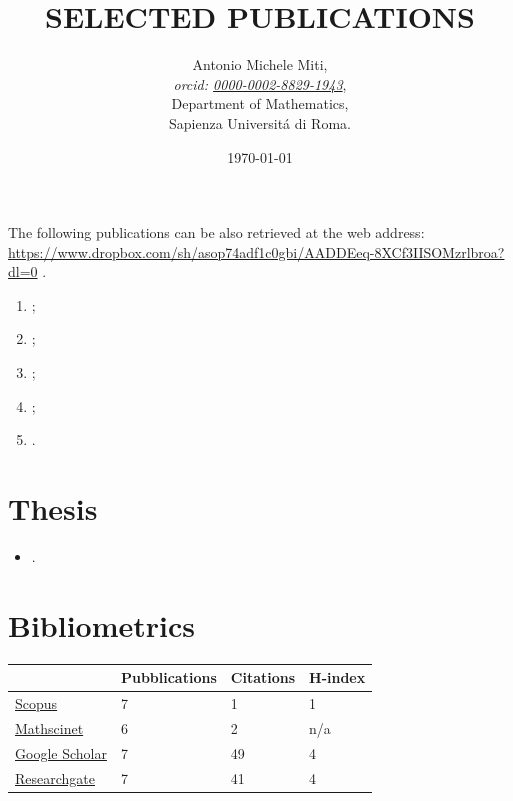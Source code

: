 \documentclass[a4paper]{article}
\title{SELECTED PUBLICATIONS}
\date{\today}
\author{
	Antonio Michele Miti,\\
	\emph{orcid: \href{https://orcid.org/0000-0002-8829-1943}{0000-0002-8829-1943}},
	\\
	Department of Mathematics,\\
	Sapienza Universit\'a di Roma.
}
\begin{document}
  

	\maketitle

	\noindent
  The following publications can be also retrieved at the web address:
  \\ 
  \url{https://www.dropbox.com/sh/asop74adf1c0gbi/AADDEeq-8XCf3IISOMzrlbroa?dl=0}
  .


	  \begin{enumerate}
    	\item {};
		\item {};		
 		\item {};
 		\item {};
 		\item {}.
	  \end{enumerate}

	\section*{Thesis}
	\begin{itemize}
		\item {}.
	\end{itemize}

	\section*{Bibliometrics}

	\begin{center}
		\begin{tabularx}{.75\linewidth}{|X|p{7em}|p{7em}|p{7em}|}
				\hline
				 & 
				 Pubblications & 
				 Citations &
				 H-index 
				 \\
				 \hline 
				 \href{https://www.scopus.com/authid/detail.uri?authorId=57218509273\#tab=preprints}{Scopus} & 7 & 1 & 1 
				 \\
				\href{https://mathscinet.ams.org/mathscinet/author?authorId=1435797}{Mathscinet} & 6 & 2 & n/a 
				\\
				\href{https://scholar.google.com/citations?user=DWKPuJYAAAAJ\&hl=it\&oi=ao}{Google Scholar} & 7 & 49 & 4 
				\\
				\href{https://www.researchgate.net/profile/Antonio-Michele-Miti?ev=hdr_xprf}{Researchgate} & 7 & 41 & 4 
				\\
				\hline
		\end{tabularx}
	\end{center}
\end{document}
